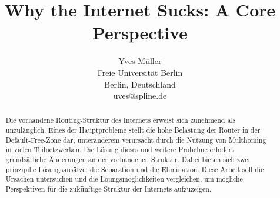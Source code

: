 \documentclass[11pt,a4paper]{article}
\author{Yves Müller \\ Freie Universität Berlin \\ Berlin, Deutschland \\ uves@spline.de}
\title{Why the Internet Sucks: A Core Perspective}
\date{}
\begin{document}
\maketitle

\begin{abstract}
Die vorhandene Routing-Struktur des Internets erweist sich zunehmend als unzulänglich. Eines der Hauptprobleme stellt die hohe Belastung der Router in der Default-Free-Zone dar, unteranderem verursacht durch die Nutzung von Multhoming in vielen Teilnetzwerken. Die Lösung dieses und weitere Probelme erfodert grundsätliche Änderungen an der vorhandenen Struktur. Dabei bieten sich zwei prinzipille Lösungsansätze: die Separation und die Elimination. Diese Arbeit soll die Ursachen untersuchen und die Löungsmöglichkeiten vergleichen, um mögliche Perspektiven für die zukünftige Struktur der Internets aufzuzeigen.
\end{abstract}

\tableofcontents











\end{document}
